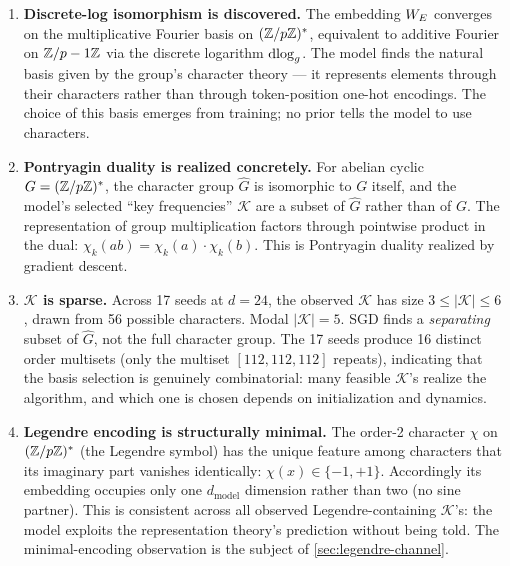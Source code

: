 \begin{enumerate}

\item \textbf{Discrete-log isomorphism is discovered.} The embedding $W_E$
  converges on the multiplicative Fourier basis on $(\mathbb{Z}/p\mathbb{Z})^*$,
  equivalent to additive Fourier on $\mathbb{Z}/p-1\mathbb{Z}$ via the discrete logarithm
  $\operatorname{dlog}_g$. The model finds the natural basis given by the group's
  character theory --- it represents elements through their characters
  rather than through token-position one-hot encodings. The choice of
  this basis emerges from training; no prior tells the model to use
  characters.

\item \textbf{Pontryagin duality is realized concretely.} For abelian
  cyclic $G = (\mathbb{Z}/p\mathbb{Z})^*$, the character group $\widehat{G}$ is
  isomorphic to $G$ itself, and the model's selected ``key frequencies''
  $\mathcal K$ are a subset of $\widehat{G}$ rather than of $G$. The
  representation of group multiplication factors through pointwise
  product in the dual: $\chi_k(ab) = \chi_k(a) \cdot \chi_k(b)$. This is
  Pontryagin duality realized by gradient descent.

\item \textbf{$\mathcal K$ is sparse.} Across 17 seeds at $d=24$, the
  observed $\mathcal K$ has size $3 \le |\mathcal K| \le 6$, drawn from
  56 possible characters. Modal $|\mathcal K| = 5$. SGD finds a
  \emph{separating} subset of $\widehat{G}$, not the full character
  group. The 17 seeds produce 16 distinct order multisets (only the
  multiset $[112, 112, 112]$ repeats), indicating that the basis
  selection is genuinely combinatorial: many feasible $\mathcal K$'s
  realize the algorithm, and which one is chosen depends on
  initialization and dynamics.

\item \textbf{Legendre encoding is structurally minimal.} The order-2
  character $\chi$ on $(\mathbb{Z}/p\mathbb{Z})^*$ (the Legendre symbol) has the unique
  feature among characters that its imaginary part vanishes identically:
  $\chi(x) \in \{-1, +1\}$. Accordingly its embedding occupies only one
  $d_{\text{model}}$ dimension rather than two (no sine partner). This
  is consistent across all observed Legendre-containing $\mathcal K$'s:
  the model exploits the representation theory's prediction without
  being told. The minimal-encoding observation is the subject of
  \cref{sec:legendre-channel}.


\end{enumerate}
